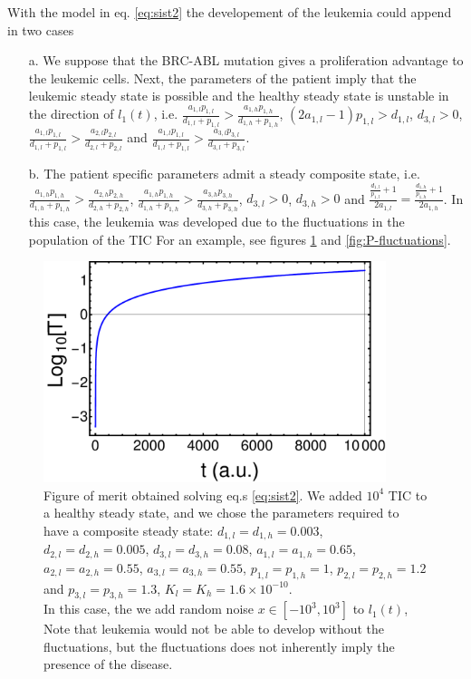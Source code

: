 \documentclass[a4paper,10pt]{article}
\begin{document}
With the model in eq. \eqref{eq:sist2} 
the developement of the leukemia could append in two cases 
\begin{enumerate}
\item [a.] We suppose that the BRC-ABL 
mutation gives a proliferation advantage to the leukemic cells. 
Next, the parameters of the patient imply that 
the leukemic steady state is possible and the
healthy steady state is unstable in the direction of $l_{1}(t)$, i.e. 
$\frac{a_{1,l}p_{1,l}}{d_{1,l}+p_{1,l}}>\frac{a_{1,h}p_{1,h}}{d_{1,h}+p_{1,h}}$,
$(2a_{1,l}-1)p_{1,l}>d_{1,l}$, $d_{3,l}>0$, 
$\frac{a_{1,l}p_{1,l}}{d_{1,l}+p_{1,l}}>\frac{a_{2,l}p_{2,l}}{d_{2,l}+p_{2,l}}$ and
$\frac{a_{1,l}p_{1,l}}{d_{1,l}+p_{1,l}}>\frac{a_{3,l}p_{3,l}}{d_{3,l}+p_{3,l}}$.


\item [b.] The patient specific parameters admit a steady composite state, i.e. 
$\frac{a_{1,h}p_{1,h}}{d_{1,h}+p_{1,h}}>\frac{a_{2,h}p_{2,h}}{d_{2,h}+p_{2,h}}$,
$\frac{a_{1,h}p_{1,h}}{d_{1,h}+p_{1,h}}>\frac{a_{3,h}p_{3,h}}{d_{3,h}+p_{3,h}}$,
$d_{3,l}>0$, $d_{3,h}>0$ and
$\frac{\frac{d_{1,l}}{p_{1,l}}+1}{2a_{1,l}}=\frac{\frac{d_{1,h}}{p_{1,h}}+1}{2a_{1,h}}$. 
In this case, the leukemia was developed due to the fluctuations in the population 
of the TIC \cite{stiehl2012mathematical} For an example, see figures \ref{fig:fluctuations} and 
\ref{fig:P-fluctuations}.
\end{enumerate}



\begin{figure}
\centering
\includegraphics[width=10cm ]{blast-fluct.pdf}
\caption{Figure of merit obtained solving eq.s \eqref{eq:sist2}.
We added $10^4$ TIC to a healthy steady state, and we chose the parameters required to have a 
composite steady state: 
$d_{1,l}=d_{1,h}=0.003$, $d_{2,l}=d_{2,h}=0.005$,
$d_{3,l}=d_{3,h}=0.08$, $a_{1,l}=a_{1,h}=0.65$, $a_{2,l}=a_{2,h}=0.55$, 
$a_{3,l}=a_{3,h}=0.55$, $p_{1,l}=p_{1,h}=1$, $p_{2,l}=p_{2,h}=1.2$ and
$p_{3,l}=p_{3,h}=1.3$, $K_{l}=K_{h}=1.6\times 10^{-10}$.\\
In this case, the we add random noise $x\in[-10^3,10^3]$ to $l_{1}(t)$,
Note that leukemia would not be able to develop without the fluctuations, 
but the fluctuations does not inherently imply the presence of the disease. }
\label{fig:fluctuations}
\end{figure}
\end{document}

